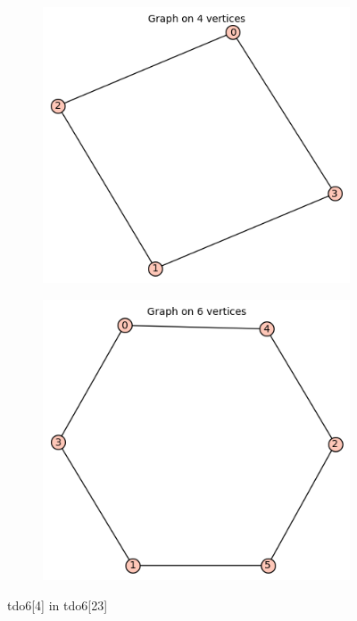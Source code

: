 \documentclass[12pt, a4paper]{article}
\begin{document}
\begin{center}
\begin{figure}[!htb]
\centering
\begin{subfigure}{0.5\textwidth}
  \centering
  \includegraphics[width=0.5\linewidth]{tdo6[4]}
\end{subfigure}%
\begin{subfigure}{0.5\textwidth}
  \centering
  \includegraphics[width=0.55\linewidth]{tdo6[23]}
\end{subfigure}
\caption{tdo6[4] in tdo6[23]}
\label{fig:test}
\end{figure}


\end{center}
\end{document}

